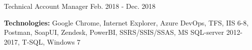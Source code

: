 \begin{cventries}
  \cventry
    {Technical Account Manager} %
    {} %
    {} %
    {Feb. 2018 - Dec. 2018} %
    {
      \begin{cvitems} %
		\item[] {\textbf{Technologies:} 
		\textcolor{rainbowcolor-olive}{Google Chrome}, 
		\textcolor{rainbowcolor-olive}{Internet Explorer}, 
		\textcolor{rainbowcolor-olive}{Azure DevOps}, 
		\textcolor{rainbowcolor-olive}{TFS}, 
		\textcolor{rainbowcolor-olive}{IIS 6-8}, 
		\textcolor{rainbowcolor-olive}{Postman}, 
		\textcolor{rainbowcolor-olive}{SoapUI}, 
		\textcolor{rainbowcolor-olive}{Zendesk}, 
		\textcolor{rainbowcolor-olive}{PowerBI}, 
		\textcolor{rainbowcolor-olive}{SSRS/SSIS/SSAS}, 
		\textcolor{rainbowcolor-olive}{MS SQL-server 2012-2017}, 
		\textcolor{rainbowcolor-indigo}{T-SQL}, 
		\textcolor{rainbowcolor-orange}{Windows 7}}		
      \end{cvitems}
    } 
    

\end{cventries}
